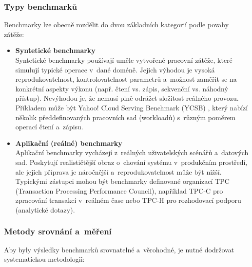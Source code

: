 \subsubsection{Typy benchmarků}
Benchmarky lze obecně rozdělit do dvou základních kategorií podle povahy zátěže:

\begin{itemize}
    \item \textbf{Syntetické benchmarky} \\
    Syntetické benchmarky používají uměle vytvořené pracovní zátěže, které simulují typické operace v~dané doméně. 
    Jejich výhodou je vysoká reprodukovatelnost, kontrolovatelnost parametrů a~možnost zaměřit se na konkrétní aspekty výkonu (např. čtení vs. zápis, sekvenční vs. náhodný přístup). 
    Nevýhodou je, že nemusí plně odrážet složitost reálného provozu. 
    Příkladem může být Yahoo! Cloud Serving Benchmark (YCSB) \cite{ycsb-workloads}, který nabízí několik předdefinovaných pracovních sad (workloadů) s~různým poměrem operací čtení a~zápisu. \cite{cooper2010benchmarking}

    \item \textbf{Aplikační (reálné) benchmarky} \\
    Aplikační benchmarky vycházejí z~reálných uživatelských scénářů a~datových sad. 
    Poskytují realističtější obraz o~chování systému v~produkčním prostředí, ale jejich příprava je náročnější a~reprodukovatelnost může být nižší. 
    Typickými zástupci mohou být benchmarky definované organizací TPC (Transaction Processing Performance Council), například TPC-C pro zpracování transakcí v~reálném čase nebo TPC-H pro rozhodovací podporu (analytické dotazy). \cite{tpcc}
\end{itemize}

\subsubsection{Metody srovnání a~měření}
Aby byly výsledky benchmarků srovnatelné a~věrohodné, je nutné dodržovat systematickou metodologii:

